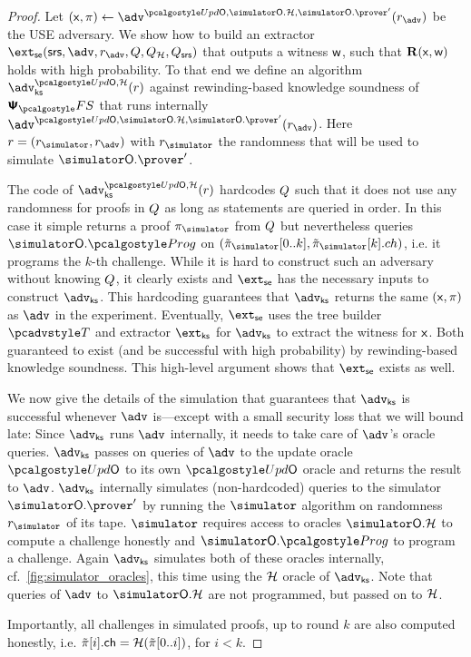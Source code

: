 \begin{proof}	
	Let $(\inp, \zkproof) \gets \advse^{\initU, \simOH, \simOP'}(r_{\advse})$ be the USE adversary. We show how to build an extractor $\extse (\srs, \advse, r_{\advse}, \Qsim, \Qro, \Qsrs)$ that outputs a witness $\mathsf{w}$, such that $\mathbf{R}(\mathsf{x}, \mathsf{w})$ holds with high probability. To that end we define an algorithm $\advcss^{\initU,\ro}(r)$ against rewinding-based knowledge soundness of $\psfs$ that runs internally $\advse^{\initU, \simOH, \simOP'}(r_{\advse})$. Here $r = (\rsim, r_{\advse})$ with $\rsim$ the randomness that will be used to simulate $\simOP'$. 

	The code of $\advcss^{\initU,\ro}(r)$ hardcodes $Q$ such that it does not use any randomness for proofs in $Q$ as long as statements are queried in order. In this case it simple returns a proof $\zkproofs$ from $Q$ but nevertheless queries $\simOHprog$ on $(\tzkproofs[0..k],\tzkproofs[k].ch)$, i.e. it programs the $k$-th challenge. While it is hard to construct such an adversary without knowing $Q$, it clearly exists and $\extse$ has the necessary inputs to construct $\advcss$. This hardcoding guarantees that $\advcss$ returns the same $(\mathsf{x},\pi)$ as $\advse$ in the experiment.
	Eventually, $\extse$ uses the tree builder $\tdv$ and extractor $\extcss$ for $\advcss$ to extract the witness for $\mathsf{x}$. Both guaranteed to exist (and be successful with high probability) by rewinding-based knowledge soundness. This high-level argument shows that $\extse$ exists as well.
	
	We now give the details of the simulation that guarantees that $\advcss$ is successful whenever $\advse$ is---except with a small security loss that we will bound late:
	Since $\advcss$ runs $\advse$ internally, it needs to take care of $\advse$'s oracle queries.
	$\advcss$ passes on queries of $\advse$ to the update oracle $\initU$ to its own $\initU$ oracle and returns the result to $\advse$.
	$\advcss$ internally simulates (non-hardcoded) queries to the simulator $\simOP'$ by running the $\simulator$ algorithm on randomness $\rsim$ of its tape. $\simulator$ requires access to oracles $\simOH$ to compute a challenge honestly and $\simOHprog$ to program a challenge. Again $\advcss$ simulates both of these oracles internally, cf.~\cref{fig:simulator_oracles}, this time using the $\mathcal{H}$ oracle of $\advcss$. 	Note that queries of $\advse$ to $\simOH$ are not programmed, but passed on to $\mathcal{H}$. 
	
	Importantly, all challenges in simulated proofs, up to round $k$ are also computed honestly, i.e. $\tilde{\pi}[i].\mathsf{ch} = \mathcal{H}(\tilde{\pi}[0..i])$, for $i < k$.


\end{proof}
